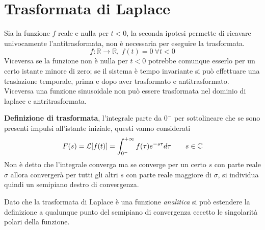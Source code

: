 \section{Trasformata di Laplace}
Sia la funzione $f$ reale e nulla per $t<0$, la seconda ipotesi permette di
ricavare univocamente l'antitrasformata, non è necessaria per eseguire la
trasformata.
$$
f:\mathbb{R}\to\mathbb{R},\ f(t)=0\ \forall t <0
$$
Viceversa se la funzione non è nulla per $t<0$
potrebbe comunque esserlo per un certo istante minore di zero; se il sistema è
tempo invariante si può effettuare una traslazione temporale, prima e dopo aver
trasformato e antitrasformato.
Viceversa una funzione sinusoidale non può essere trasformata nel dominio di
laplace e antritrasformata.

\textbf{Definizione di trasformata}, l'integrale parte da $0^-$ per
sottolineare che se sono presenti impulsi all'istante iniziale, questi vanno
considerati
$$
F(s)=\mathcal{L}[f(t)] = \int_{0^-}^{+\infty} f(\tau)e^{-s\tau} d\tau \qquad s
\in \mathbb{C}
$$
Non è detto che l'integrale converga ma se converge per un certo $s$ con
parte reale $\sigma$ allora convergerà per tutti gli altri $s$ con parte
reale maggiore di $\sigma$, si individua quindi un semipiano destro di
convergenza.

Dato che la trasformata di Laplace è una funzione \textit{analitica} si può
estendere la definizione a qualunque punto del semipiano di convergenza eccetto
le singolarità polari della funzione.

